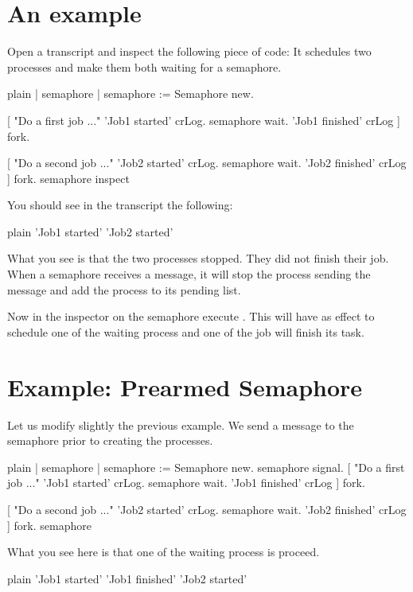 \documentclass[10pt,twoside,english]{_support/latex/sbabook/sbabook}
\begin{document}
\section{An example}
Open a transcript and inspect the following piece of code: It schedules two processes and make them both waiting for a semaphore. 

\begin{displaycode}{plain}
| semaphore |
semaphore := Semaphore new.

[ "Do a first job ..."
	'Job1 started' crLog.
	semaphore wait. 
	'Job1 finished' crLog
	] fork.

[ "Do a second job ..."
	'Job2 started' crLog.
	semaphore wait. 
	'Job2 finished' crLog
	] fork.
semaphore inspect
\end{displaycode}

You should see in the transcript the following:

\begin{displaycode}{plain}
'Job1 started'
'Job2 started'
\end{displaycode}

What you see is that the two processes stopped. They did not finish their job. 
When a semaphore receives a  message, it will stop the process sending the message and add the process to its pending list. 

Now in the inspector on the semaphore execute .
This will have as effect to schedule one of the waiting process and one of the job will finish its task.
\section{Example: Prearmed Semaphore}
Let us modify slightly the previous example. 
We send a  message to the semaphore prior to creating the processes.

\begin{displaycode}{plain}
| semaphore |
semaphore := Semaphore new.
semaphore signal. 
[ "Do a first job ..."
	'Job1 started' crLog.
	semaphore wait. 
	'Job1 finished' crLog
	] fork.

[ "Do a second job ..."
	'Job2 started' crLog.
	semaphore wait. 
	'Job2 finished' crLog
	] fork.
semaphore
\end{displaycode}

What you see here is that one of the waiting process is proceed.

\begin{displaycode}{plain}
'Job1 started'
'Job1 finished'
'Job2 started'
\end{displaycode}
\end{document}
